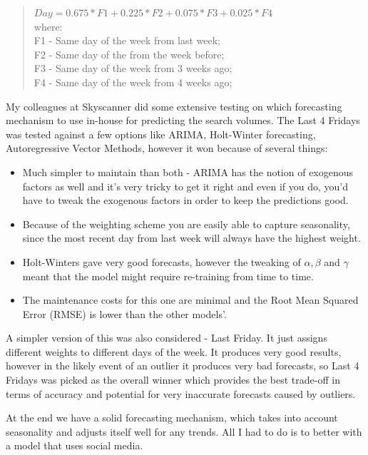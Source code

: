\documentclass[minf,twoside,singlespacing,parskip,frontabs]{infthesis}
\begin{document}
\begin{quotation}
$Day=0.675*F1 + 0.225*F2 + 0.075*F3 + 0.025*F4$ \\
where: \\
F1 - Same day of the week from last week;\\
F2 - Same day of the from the week before;\\
F3 - Same day of the week from 3 weeks ago;\\
F4 - Same day of the week from 4 weeks ago;\\
\end{quotation}

My colleagues at Skyscanner did some extensive testing on which forecasting mechanism to use in-house for predicting the search volumes. The Last 4 Fridays was tested against a few options like ARIMA, Holt-Winter forecasting, Autoregressive Vector Methods, however it won because of several things:
\begin{itemize}
\item Much simpler to maintain than both - ARIMA has the notion of exogenous factors as well and it's very tricky to get it right and even if you do, you'd have to tweak the exogenous factors in order to keep the predictions good. 
\item Because of the weighting scheme you are easily able to capture seasonality, since the most recent day from last week will always have the highest weight.
\item Holt-Winters gave very good forecasts, however the tweaking of $\alpha, \beta$ and $\gamma$ meant that the model might require re-training from time to time. 
\item The maintenance costs for this one are minimal and the Root Mean Squared Error (RMSE) is lower than the other models'.
\end{itemize}

A simpler version of this was also considered - Last Friday. It just assigns different weights to different days of the week. It produces very good results, however in the likely event of an outlier it produces very bad forecasts, so Last 4 Fridays was picked as the overall winner which provides the best trade-off in terms of accuracy and potential for very inaccurate forecasts caused by outliers.

At the end we have a solid forecasting mechanism, which takes into account seasonality and adjusts itself well for any trends. All I had to do is to better with a model that uses social media. 
\end{document}

